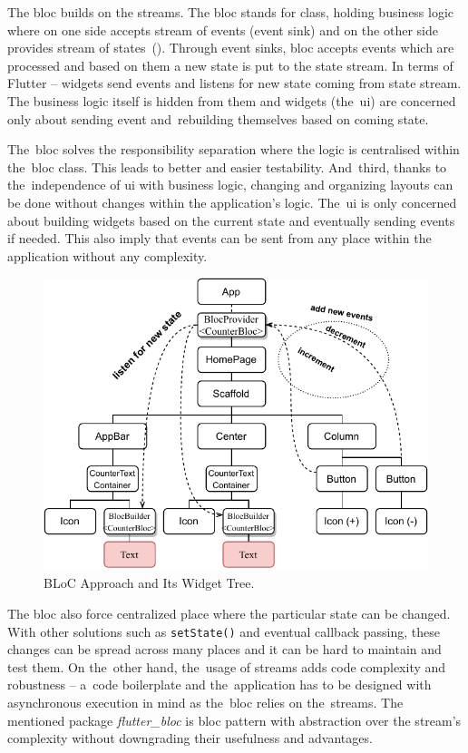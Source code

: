 The \gls{bloc} builds on the streams. The \gls{bloc} stands for class, holding business logic where on one side accepts stream of events (event sink) and on the other side provides stream of states~(). Through event sinks, \gls{bloc} accepts events which are processed and based on them a new state is put to the state stream. In terms of Flutter -- widgets send events and listens for new state coming from state stream. The business logic itself is hidden from them and widgets (the~\gls{ui}) are concerned only about sending event and~rebuilding themselves based on coming state.

The~\gls{bloc} solves the responsibility separation where the logic is centralised within the~\gls{bloc} class. This leads to better and easier testability. And~third, thanks to the~independence of \gls{ui} with business logic, changing and organizing layouts can be done without changes within the application's logic. The~\gls{ui} is only concerned about building widgets based on the current state and eventually sending events if needed. This also imply that events can be sent from any place within the application without any complexity.

\begin{figure}[ht]
    \centering
    \includegraphics[width=0.75\linewidth]{img/flutter/counter-bloc.pdf}
    \caption{BLoC Approach and Its Widget Tree.}
    \label{fig:counter-app-bloc}
\end{figure}

The \gls{bloc} also force centralized place where the particular state can be changed. With other solutions such as \verb|setState()| and eventual callback passing, these changes can be spread across many places and it can be hard to maintain and test them. On the~other hand, the~usage of streams adds code complexity and robustness -- a~code boilerplate and the~application has to be designed with asynchronous execution in mind as the~\gls{bloc} relies on the~streams. The mentioned package \textit{flutter\_bloc} is \gls{bloc} pattern with abstraction over the stream's complexity without downgrading their usefulness and advantages. 


